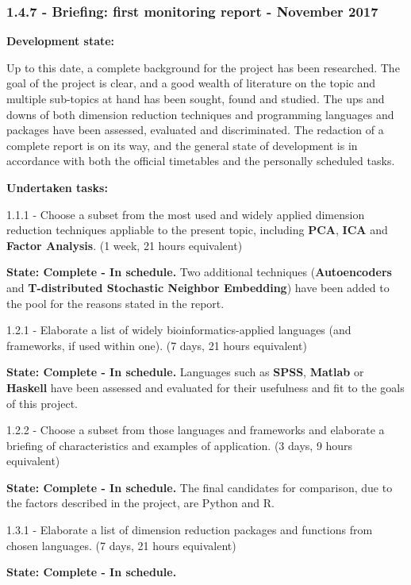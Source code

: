 \documentclass[]{article}
\begin{document}
\subsubsection{1.4.7 - Briefing: first monitoring report - November
2017}\label{briefing-first-monitoring-report---november-2017}

\textbf{Development state:}

Up to this date, a complete background for the project has been
researched. The goal of the project is clear, and a good wealth of
literature on the topic and multiple sub-topics at hand has been sought,
found and studied. The ups and downs of both dimension reduction
techniques and programming languages and packages have been assessed,
evaluated and discriminated. The redaction of a complete report is on
its way, and the general state of development is in accordance with both
the official timetables and the personally scheduled tasks.

\textbf{Undertaken tasks:}

1.1.1 - Choose a subset from the most used and widely applied dimension
reduction techniques appliable to the present topic, including
\textbf{PCA}, \textbf{ICA} and \textbf{Factor Analysis}. (1 week, 21
hours equivalent)

\textbf{State: Complete - In schedule.} Two additional techniques
(\textbf{Autoencoders} and \textbf{T-distributed Stochastic Neighbor
Embedding}) have been added to the pool for the reasons stated in the
report.

1.2.1 - Elaborate a list of widely bioinformatics-applied languages (and
frameworks, if used within one). (7 days, 21 hours equivalent)

\textbf{State: Complete - In schedule.} Languages such as \textbf{SPSS},
\textbf{Matlab} or \textbf{Haskell} have been assessed and evaluated for
their usefulness and fit to the goals of this project.

1.2.2 - Choose a subset from those languages and frameworks and
elaborate a briefing of characteristics and examples of application. (3
days, 9 hours equivalent)

\textbf{State: Complete - In schedule.} The final candidates for
comparison, due to the factors described in the project, are Python and
R.

1.3.1 - Elaborate a list of dimension reduction packages and functions
from chosen languages. (7 days, 21 hours equivalent)

\textbf{State: Complete - In schedule.}
\end{document}
